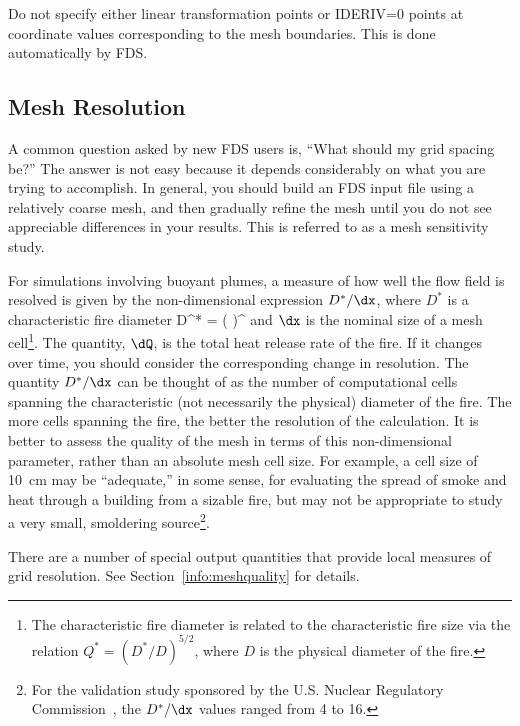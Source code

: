 \documentclass[11pt]{book}
\begin{document}
Do not specify either linear transformation points or {\ct IDERIV=0} points at coordinate values corresponding to
the mesh boundaries. This is done automatically by FDS.


\subsection{Mesh Resolution}
\label{info:Mesh_Resolution}

A common question asked by new FDS users is, ``What should my grid spacing be?''
The answer is not easy because it depends considerably on what you are trying
to accomplish. In general, you should build an FDS input file using a relatively
coarse mesh, and then gradually refine the mesh until you do not see
appreciable differences in your results. This is referred to as a mesh sensitivity study.

For simulations involving buoyant plumes, a measure of how well the flow field is resolved is given by the
non-dimensional expression $D^*/\dx$, where $D^*$ is a characteristic
fire diameter
\be D^* = \left(
     \right)^  \ee
and $\dx$ is the nominal size of a mesh cell\footnote{The characteristic
fire diameter is related to the characteristic fire size via the
relation $Q^* = (D^*/D)^{5/2}$, where $D$ is the physical diameter of the
fire.}. The quantity, $\dQ$, is the total heat release rate of the fire. If it changes over time, you should consider the
corresponding change in resolution. The quantity $D^*/\dx$ can be thought of as the number of computational cells
spanning the characteristic (not necessarily the physical) diameter of the fire.
The more cells spanning the fire, the better the resolution of the
calculation. It is better to assess the quality of the mesh in terms
of this non-dimensional parameter, rather than an absolute mesh cell size.
For example, a cell size of 10~cm may be ``adequate,'' in some sense,
for evaluating the spread of smoke and heat through a building from a
sizable fire, but may not be appropriate to study a very small, smoldering source\footnote{For the validation study sponsored by the
U.S. Nuclear Regulatory Commission~\cite{NUREG_1824_Sup_1}, the $D^*/\dx$ values ranged from 4 to 16.}.


There are a number of special output quantities that provide local measures of grid resolution. See Section~\ref{info:meshquality} for details.




\clearpage
\end{document}
